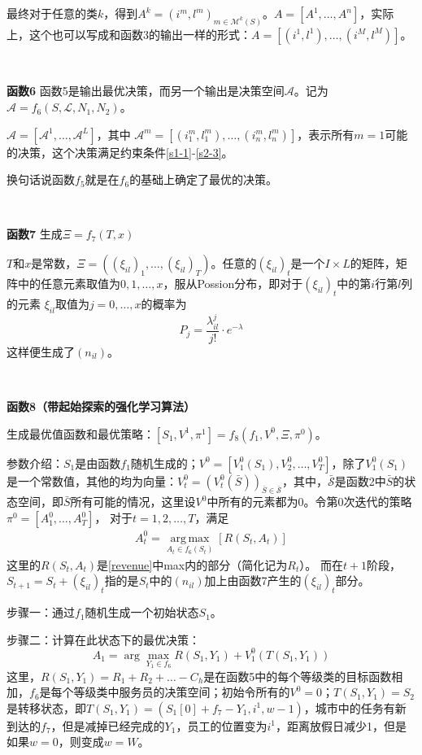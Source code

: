 \documentclass[a4paper,11pt]
{elsarticle}%
\begin{document}
最终对于任意的类$k$，得到$A^k=(i^m,l^m)_{m\in\mathcal{M}^k(S)}$。$A=[A^1,\ldots,A^n]$，实际上，这个也可以写成和函数3的输出一样的形式：$A=[(i^1,l^1),\ldots,(i^M,l^M)]$。

~

\textbf{函数6} 
函数5是输出最优决策，而另一个输出是决策空间$\mathcal{A}$。记为$\mathcal{A}=f_6(S,\mathcal{L},N_1,N_2)$。

$\mathcal{A}=[\mathcal{A}^1,\ldots,\mathcal{A}^L]$，其中
$\mathcal{A}^m=[(i_1^m,l_1^m),\ldots,(i_n^m,l_n^m)]$，表示所有$m=1$可能的决策，这个决策满足约束条件\eqref{s1-1}-\eqref{s2-3}。

换句话说函数$f_5$就是在$f_6$的基础上确定了最优的决策。

~

\textbf{函数7}
生成$\Xi=f_7(T,x)$

$T$和$x$是常数，$\Xi=((\xi_{il})_1,\ldots,(\xi_{il})_T)$。任意的$(\xi_{il})_t$是一个$I\times L$的矩阵，矩阵中的任意元素取值为$0,1,\ldots,x$，服从Possion分布，即对于$(\xi_{il})_t$中的第$i$行第$l$列的元素
$\xi_{il}$取值为$j=0,\ldots,x$的概率为
$$
P_j=\frac{\lambda_{il}^j}{j!}\cdot e^{-\lambda}
$$
这样便生成了$(n_{il})$。

~

\textbf{函数8（带起始探索的强化学习算法）}

生成最优值函数和最优策略：$[S_1,V^1,\pi^1]=f_8(f_1,V^0,\Xi,\pi^0)$。

参数介绍：$S_1$是由函数$f_1$随机生成的；$V^0=[V_1^0(S_1),V_2^0
,\ldots,V_T^0]$，除了$V_1^0(S_1)$是一个常数值，其他的均为向量：$V_t^0=(V_t^0(\bar{S}))_{\bar{S}\in\bar{\mathcal{S}}}$，其中，$\bar{\mathcal{S}}$是函数2中$\bar{S}$的状态空间，即$\bar{S}$所有可能的情况，这里设$V^0$中所有的元素都为0。令第0次迭代的策略
$\pi^0=[A^0_1,\ldots,A^0_T]$，
对于$t=1,2,\ldots,T$，满足
\begin{align}\label{A}
A_t^0=\operatorname*{arg\,max}\limits_{A_t\in f_6(S_t)}[{R}({S}_t,{A}_t)]
\end{align}
这里的$R(S_t,A_t)$是\eqref{revenue}中max内的部分（简化记为$R_t$）。
而在$t+1$阶段，
$S_{t+1}=S_t+(\xi_{il})_t$指的是$S_t$中的$(n_{il})$加上由函数7产生的$(\xi_{il})_t$部分。

步骤一：通过$f_1$随机生成一个初始状态$S_1$。

步骤二：计算在此状态下的最优决策：
$$
A_1=\arg\max\limits_{Y_1\in f_6}R(S_1,Y_1)+V^0_1(T(S_1,Y_1))
$$
这里，$R(S_1,Y_1)=R_1+R_2+\ldots-C_h$是在函数5中的每个等级类的目标函数相加，$f_6$是每个等级类中服务员的决策空间；初始令所有的$V^0=0$；$T(S_1,Y_1)=S_2$是转移状态，即$T(S_1,Y_1)=(S_1[0]+f_7-Y_1, i^1,w-1)$，城市中的任务有新到达的$f_7$，但是减掉已经完成的$Y_1$，员工的位置变为$i^1$，距离放假日减少1，但是如果$w=0$，则变成$w=W$。
\end{document}
